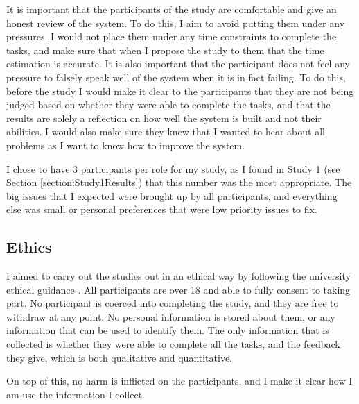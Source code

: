 It is important that the participants of the study are comfortable and give an honest review of the system. To do this, I aim to avoid putting them under any pressures. I would not place them under any time constraints to complete the tasks, and make sure that when I propose the study to them that the time estimation is accurate. It is also important that the participant does not feel any pressure to falsely speak well of the system when it is in fact failing. To do this, before the study I would make it clear to the participants that they are not being judged based on whether they were able to complete the tasks, and that the results are solely a reflection on how well the system is built and not their abilities. I would also make sure they knew that I wanted to hear about all problems as I want to know how to improve the system.

I chose to have 3 participants per role for my study, as I found in Study 1 (see Section \ref{section:Study1Results}) that this number was the most appropriate. The big issues that I expected were brought up by all participants, and everything else was small or personal preferences that were low priority issues to fix.

\subsection{Ethics}

I aimed to carry out the studies out in an ethical way by following the university ethical guidance \cite{staffnet_2016}. All participants are over 18 and able to fully consent to taking part. No participant is coerced into completing the study, and they are free to withdraw at any point. No personal information is stored about them, or any information that can be used to identify them. The only information that is collected is whether they were able to complete all the tasks, and the feedback they give, which is both qualitative and quantitative.

On top of this, no harm is inflicted on the participants, and I make it clear how I am use the information I collect. 

